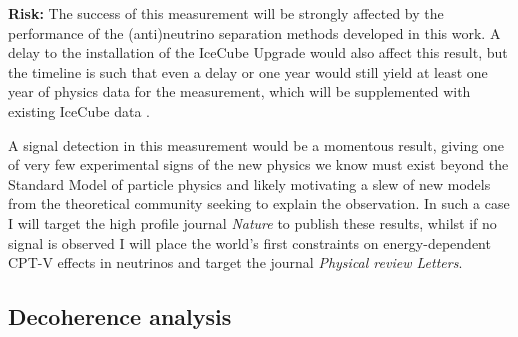 \documentclass[a4paper,11pt]{article}
\begin{document}
\textbf{Risk:} The success of this measurement will be strongly affected by the performance of the (anti)neutrino separation methods developed in this work. A delay to the installation of the IceCube Upgrade would also affect this result, but the timeline is such that even a delay or one year would still yield at least one year of physics data for the measurement, which will be supplemented with existing IceCube data .

A signal detection in this measurement would be a momentous result, giving one of very few experimental signs of the new physics we know must exist beyond the Standard Model of particle physics and likely motivating a slew of new models from the theoretical community seeking to explain the observation. In such a case I will target the high profile journal \textit{Nature} to publish these results, whilst if no signal is observed I will place the world's first constraints on energy-dependent CPT-V effects in neutrinos and target the journal \textit{Physical review Letters}. \\

\subsection{Decoherence analysis}
\end{document}
